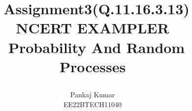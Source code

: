 \documentclass[journal,12pt,twocolumn]{IEEEtran}
\theoremstyle{remark}
\begin{document}
%




\vspace{3cm}

\title{
\Huge \ Assignment3(Q.11.16.3.13)\\ NCERT EXAMPLER\\
\Huge\ Probability And Random Processes\\
\large\author{Pankaj Kumar \\EE22BTECH11040}
}





\maketitle

\newpage


\bigskip

\renewcommand{\thefigure}{\theenumi}
\renewcommand{\thetable}{\theenumi}

%

%




%
\end{document}
